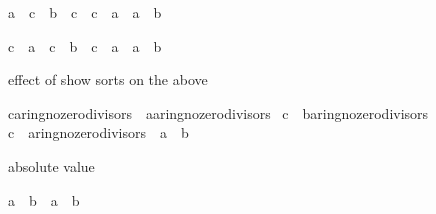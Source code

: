 \begin{isabellebody}
\begin{isamarkuptext}
\begin{isabelle}%
{\isacharparenleft}a\ {\isacharasterisk}\ c\ {\isacharequal}\ b\ {\isacharasterisk}\ c{\isacharparenright}\ {\isacharequal}\ {\isacharparenleft}c\ {\isacharequal}\ {\isacharparenleft}{}{\isasymColon}{\isacharprime}a{\isacharparenright}\ {\isasymor}\ a\ {\isacharequal}\ b{\isacharparenright}%
\end{isabelle}

\begin{isabelle}%
{\isacharparenleft}c\ {\isacharasterisk}\ a\ {\isacharequal}\ c\ {\isacharasterisk}\ b{\isacharparenright}\ {\isacharequal}\ {\isacharparenleft}c\ {\isacharequal}\ {\isacharparenleft}{}{\isasymColon}{\isacharprime}a{\isacharparenright}\ {\isasymor}\ a\ {\isacharequal}\ b{\isacharparenright}%
\end{isabelle}
%
\end{isamarkuptext}%
\isamarkuptrue%
%
\begin{isamarkuptext}%
effect of show sorts on the above

\begin{isabelle}%
{\isacharparenleft}{\isacharparenleft}c{\isasymColon}{\isacharprime}a{\isasymColon}ring{\isacharunderscore}no{\isacharunderscore}zero{\isacharunderscore}divisors{\isacharparenright}\ {\isacharasterisk}\ {\isacharparenleft}a{\isasymColon}{\isacharprime}a{\isasymColon}ring{\isacharunderscore}no{\isacharunderscore}zero{\isacharunderscore}divisors{\isacharparenright}\ {\isacharequal}\isanewline
\isaindent{{\isacharparenleft}}c\ {\isacharasterisk}\ {\isacharparenleft}b{\isasymColon}{\isacharprime}a{\isasymColon}ring{\isacharunderscore}no{\isacharunderscore}zero{\isacharunderscore}divisors{\isacharparenright}{\isacharparenright}\ {\isacharequal}\isanewline
{\isacharparenleft}c\ {\isacharequal}\ {\isacharparenleft}{}{\isasymColon}{\isacharprime}a{\isasymColon}ring{\isacharunderscore}no{\isacharunderscore}zero{\isacharunderscore}divisors{\isacharparenright}\ {\isasymor}\ a\ {\isacharequal}\ b{\isacharparenright}%
\end{isabelle}
%
\end{isamarkuptext}%
\isamarkuptrue%
%
\begin{isamarkuptext}%
absolute value

\begin{isabelle}%
{\isasymbar}a\ {\isacharasterisk}\ b{\isasymbar}\ {\isacharequal}\ {\isasymbar}a{\isasymbar}\ {\isacharasterisk}\ {\isasymbar}b{\isasymbar}%
\end{isabelle}


\end{isamarkuptext}
\end{isabellebody}

